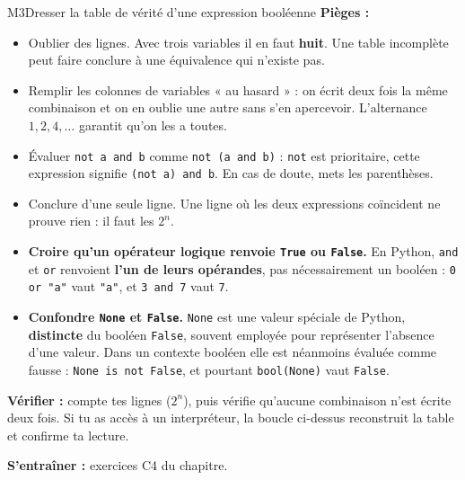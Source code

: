 \begin{fichemethode}{M3}{Dresser la table de vérité d'une expression booléenne}
\textbf{Pièges :}
\begin{itemize}
  \item Oublier des lignes. Avec trois variables il en faut \textbf{huit}. Une table
    incomplète peut faire conclure à une équivalence qui n'existe pas.
  \item Remplir les colonnes de variables « au hasard » : on écrit deux fois la même
    combinaison et on en oublie une autre sans s'en apercevoir. L'alternance
    $1,2,4,\dots$ garantit qu'on les a toutes.
  \item Évaluer \lstinline{not a and b} comme \lstinline{not (a and b)} : \lstinline{not}
    est prioritaire, cette expression signifie \lstinline{(not a) and b}. En cas de doute,
    mets les parenthèses.
  \item Conclure d'une seule ligne. Une ligne où les deux expressions coïncident ne prouve
    rien : il faut les $2^{n}$.
  \item \textbf{Croire qu'un opérateur logique renvoie \lstinline{True} ou \lstinline{False}.}
    En Python, \lstinline{and} et \lstinline{or} renvoient \textbf{l'un de leurs opérandes},
    pas nécessairement un booléen : \lstinline{0 or "a"} vaut \lstinline{"a"}, et
    \lstinline{3 and 7} vaut \lstinline{7}.
  \item \textbf{Confondre \lstinline{None} et \lstinline{False}.} \lstinline{None} est une
    valeur spéciale de Python, \textbf{distincte} du booléen \lstinline{False}, souvent
    employée pour représenter l'absence d'une valeur. Dans un contexte booléen elle est
    néanmoins évaluée comme fausse : \lstinline{None is not False}, et pourtant
    \lstinline{bool(None)} vaut \lstinline{False}.
\end{itemize}

\textbf{Vérifier :} compte tes lignes ($2^{n}$), puis vérifie qu'aucune combinaison n'est
écrite deux fois. Si tu as accès à un interpréteur, la boucle ci-dessus reconstruit la table
et confirme ta lecture.

\textbf{S'entraîner :} exercices C4 du chapitre.
\end{fichemethode}
